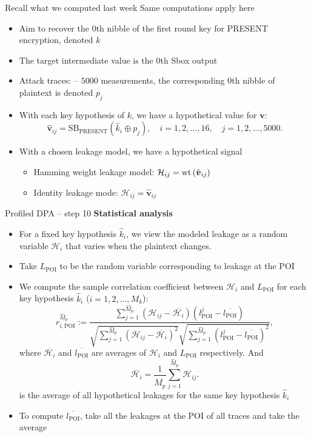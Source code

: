 \begin{frame}{Recall what we computed last week}
Same computations apply here
    \begin{example}
    \begin{itemize}
        \item Aim to recover the $0$th nibble of the first round key for PRESENT encryption, denoted $k$
        \item The target intermediate value is the $0$th Sbox output
        \item Attack traces: \dataranone -- $5000$ measurements, the corresponding $0$th nibble of plaintext is denoted $p_j$
        \item With each key hypothesis of $k$, we have a hypothetical value for $\boldsymbol{v}$:
        \[
    \hat{\boldsymbol{v}}_{ij}=\text{SB}_{\text{PRESENT}}(\hat{k}_i\oplus p_j),\quad i=1,2,\dots,16,\quad j=1,2,\dots,5000.
    \]
    \item With a chosen leakage model, we have a hypothetical signal
    \begin{itemize}
        \item Hamming weight leakage model: $\mathcal{H}_{ij}=\textrm{wt}\left(\hat{\boldsymbol{v}}_{ij}\right)$
        \item Identity leakage mode: $\mathcal{H}_{ij}=\hat{\boldsymbol{v}}_{ij}$
    \end{itemize}
    \end{itemize}
    \end{example}
\end{frame}

\begin{frame}{Profiled DPA -- step 10}
   \textbf{Statistical analysis}
    \begin{itemize}
        \item  For a fixed key hypothesis $\hat{k}_i$, we view the modeled leakage as a random variable $\mathcal{H}_i$ that varies when the plaintext changes.
       \item Take $L_\text{POI}$ to be the random variable corresponding to leakage at the POI
    \item We compute the sample correlation coefficient between $\mathcal{H}_{i}$ and $L_{\text{POI}}$ for each key hypothesis $\hat{k}_i$ ($i=1,2,\dots,M_k$):
    \begin{equation*}
    r^{\hat{M}_p}_{i,\text{POI}}:=\frac{\sum_{j=1}^{\hat{M}_p}(\mathcal{H}_{ij}-\overline{\mathcal{H}_i})(l_{\text{POI}}^j-\overline{l_{\text{POI}}})}{\sqrt{\sum_{j=1}^{\hat{M}_p}(\mathcal{H}_{ij}-\overline{\mathcal{H}_i})^2}\sqrt{\sum_{j=1}^{\hat{M}_p}(l_{\text{POI}}^j-\overline{l_{\text{POI}}})^2}},
    \end{equation*}
    where $\overline{\mathcal{H}_i}$ and $\overline{l_{\text{POI}}}$ are averages of $\mathcal{H}_i$ and $L_\text{POI}$ respectively. And
    \[
    \overline{\mathcal{H}_i} = \frac{1}{\hat{M}_p}\sum_{j=1}^{\hat{M}_p}\mathcal{H}_{ij}.
    \]
    is the average of all hypothetical leakages for the same key hypothesis $\hat{k}_i$
    \item To compute $\overline{l_{\text{POI}}}$, take all the leakages at the POI of all traces and take the average
    \end{itemize}
\end{frame}

